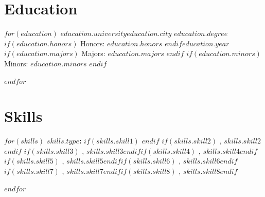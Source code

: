 \documentclass[11pt]{cv-class}
\begin{document}
\section{Education}
$for(education)$
    \noindent\textbf{$education.university$}\hfill{$education.city$}\break
    \textit{$education.degree$}\hfill{$if(education.honors)$ Honors: \textit{$education.honors$} $endif$}\hfill{$education.year$}\break
    {$if(education.majors)$ Majors: {$education.majors$} $endif$}
    {$if(education.minors)$ \split{} Minors: {$education.minors$} $endif$}
    \par
$endfor$
\bigskip

\section{Skills}
$for(skills)$
    \noindent\textbf{$skills.type$: }$if(skills.skill1)$  $endif$ $if(skills.skill2)$ \unskip, {$skills.skill2$} $endif$ $if(skills.skill3)$ \unskip, {$skills.skill3$}$endif$\hfill $if(skills.skill4)$ \unskip, {$skills.skill4$}$endif$\hfill $if(skills.skill5)$ \unskip, {$skills.skill5$}$endif$\hfill $if(skills.skill6)$ \unskip, {$skills.skill6$}$endif$\hfill $if(skills.skill7)$ \unskip, {$skills.skill7$}$endif$\hfill $if(skills.skill8)$ \unskip, {$skills.skill8$}$endif$\hfill \par
$endfor$
\end{document}
